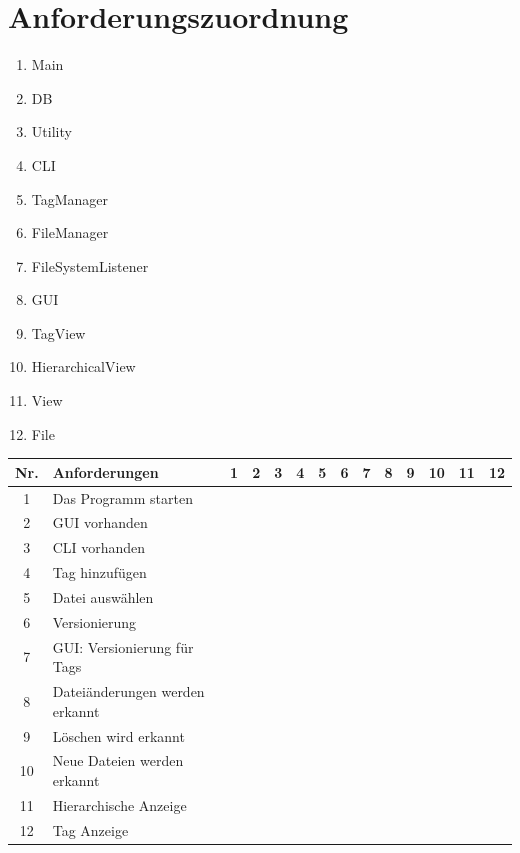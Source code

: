 \documentclass[10pt,paper=a4,final]{scrartcl}
\begin{document}
\section{Anforderungszuordnung}
\begin{enumerate}
  \item Main
  \item DB
  \item Utility
  \item CLI
  \item TagManager
  \item FileManager
  \item FileSystemListener
  \item GUI
  \item TagView
  \item HierarchicalView
  \item View
  \item File
\end{enumerate}
\begin{tabularx}{\textwidth}{|c|X|c|c|c|c|c|c|c|c|c|c|c|c|}
  \hline
  \bf Nr. & \bf Anforderungen &\bf 1 &\bf 2 &\bf 3 &\bf 4 &\bf 5 &\bf 6 &\bf 7 &\bf 8 &\bf 9 &\bf 10 &\bf 11 &\bf 12 \\ \hline
  1 & Das Programm starten & \cellcolor[gray]{0.7} & & & & & & & & & & & \\ \hline
  2 & GUI vorhanden & & & & & & & & \cellcolor[gray]{0.7} &\cellcolor[gray]{0.7} &\cellcolor[gray]{0.7} &\cellcolor[gray]{0.7} & \\ \hline
  3 & CLI vorhanden & & & &\cellcolor[gray]{0.7} & & & & & & & & \\ \hline
  4 & Tag hinzuf\"ugen & & & &\cellcolor[gray]{0.7} &\cellcolor[gray]{0.7} & & & &\cellcolor[gray]{0.7} & & & \\ \hline
  5 & Datei ausw\"ahlen & & & & & & \cellcolor[gray]{0.7} & & & & & & \cellcolor[gray]{0.7} \\ \hline
  6 & Versionierung & & \cellcolor[gray]{0.7} & & & & \cellcolor[gray]{0.7} & \cellcolor[gray]{0.7} & & & & & \cellcolor[gray]{0.7} \\ \hline
  7 & GUI: Versionierung f\"ur Tags & & & & & & & & \cellcolor[gray]{0.7} & & & & \\ \hline
  8 & Datei\"anderungen werden erkannt & & & & & & & & \cellcolor[gray]{0.7} & & & & \\ \hline
  9 & L\"oschen wird erkannt & & & & & & & & \cellcolor[gray]{0.7} & & & & \\ \hline
  10 & Neue Dateien werden erkannt & & & & & & & & \cellcolor[gray]{0.7} & & & & \\ \hline
  11 & Hierarchische Anzeige & & & & & & & & & & & \cellcolor[gray]{0.7} & \\ \hline
  12 & Tag Anzeige & & & & & & & & & \cellcolor[gray]{0.7} & & & \\ \hline
\end{tabularx}
\end{document}
